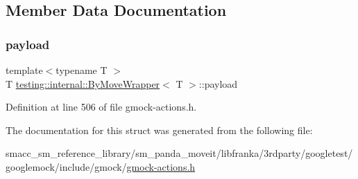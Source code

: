 \subsection{Member Data Documentation}
\mbox{\label{structtesting_1_1internal_1_1ByMoveWrapper_ae8407b1ae99db3f00797d68b9ee9e870}} 
\subsubsection{\texorpdfstring{payload}{payload}}
{\footnotesize\ttfamily template$<$typename T $>$ \\
T \hyperlink{structtesting_1_1internal_1_1ByMoveWrapper}{testing\+::internal\+::\+By\+Move\+Wrapper}$<$ T $>$\+::payload}



Definition at line 506 of file gmock-\/actions.\+h.



The documentation for this struct was generated from the following file\+:\begin{DoxyCompactItemize}
\item 
smacc\+\_\+sm\+\_\+reference\+\_\+library/sm\+\_\+panda\+\_\+moveit/libfranka/3rdparty/googletest/googlemock/include/gmock/\hyperlink{gmock-actions_8h}{gmock-\/actions.\+h}\end{DoxyCompactItemize}
